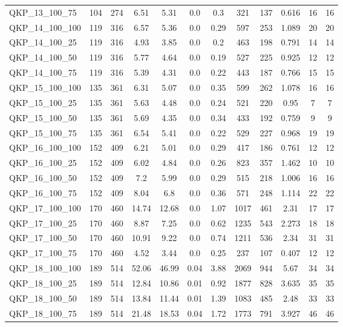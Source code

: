 \begin{table}[!h]
{\begin{tabular}{lccccccccccc}
QKP\_13\_100\_75 & 104 & 274 & 6.51 & 5.31 & 0.0 & 0.3 & 321 & 137 & 0.616 & 16 & 16\\
QKP\_14\_100\_100 & 119 & 316 & 6.57 & 5.36 & 0.0 & 0.29 & 597 & 253 & 1.089 & 20 & 20\\
QKP\_14\_100\_25 & 119 & 316 & 4.93 & 3.85 & 0.0 & 0.2 & 463 & 198 & 0.791 & 14 & 14\\
QKP\_14\_100\_50 & 119 & 316 & 5.77 & 4.64 & 0.0 & 0.19 & 527 & 225 & 0.925 & 12 & 12\\
QKP\_14\_100\_75 & 119 & 316 & 5.39 & 4.31 & 0.0 & 0.22 & 443 & 187 & 0.766 & 15 & 15\\
QKP\_15\_100\_100 & 135 & 361 & 6.31 & 5.07 & 0.0 & 0.35 & 599 & 262 & 1.078 & 16 & 16\\
QKP\_15\_100\_25 & 135 & 361 & 5.63 & 4.48 & 0.0 & 0.24 & 521 & 220 & 0.95 & 7 & 7\\
QKP\_15\_100\_50 & 135 & 361 & 5.69 & 4.35 & 0.0 & 0.34 & 433 & 192 & 0.759 & 9 & 9\\
QKP\_15\_100\_75 & 135 & 361 & 6.54 & 5.41 & 0.0 & 0.22 & 529 & 227 & 0.968 & 19 & 19\\
QKP\_16\_100\_100 & 152 & 409 & 6.21 & 5.01 & 0.0 & 0.29 & 417 & 186 & 0.761 & 12 & 12\\
QKP\_16\_100\_25 & 152 & 409 & 6.02 & 4.84 & 0.0 & 0.26 & 823 & 357 & 1.462 & 10 & 10\\
QKP\_16\_100\_50 & 152 & 409 & 7.2 & 5.99 & 0.0 & 0.29 & 515 & 218 & 1.006 & 16 & 16\\
QKP\_16\_100\_75 & 152 & 409 & 8.04 & 6.8 & 0.0 & 0.36 & 571 & 248 & 1.114 & 22 & 22\\
QKP\_17\_100\_100 & 170 & 460 & 14.74 & 12.68 & 0.0 & 1.07 & 1017 & 461 & 2.31 & 17 & 17\\
QKP\_17\_100\_25 & 170 & 460 & 8.87 & 7.25 & 0.0 & 0.62 & 1235 & 543 & 2.273 & 18 & 18\\
QKP\_17\_100\_50 & 170 & 460 & 10.91 & 9.22 & 0.0 & 0.74 & 1211 & 536 & 2.34 & 31 & 31\\
QKP\_17\_100\_75 & 170 & 460 & 4.52 & 3.44 & 0.0 & 0.25 & 237 & 107 & 0.407 & 12 & 12\\
QKP\_18\_100\_100 & 189 & 514 & 52.06 & 46.99 & 0.04 & 3.88 & 2069 & 944 & 5.67 & 34 & 34\\
QKP\_18\_100\_25 & 189 & 514 & 12.84 & 10.86 & 0.01 & 0.92 & 1877 & 828 & 3.635 & 35 & 35\\
QKP\_18\_100\_50 & 189 & 514 & 13.84 & 11.44 & 0.01 & 1.39 & 1083 & 485 & 2.48 & 33 & 33\\
QKP\_18\_100\_75 & 189 & 514 & 21.48 & 18.53 & 0.04 & 1.72 & 1773 & 791 & 3.927 & 46 & 46\\

\end{tabular}}
\end{table}
